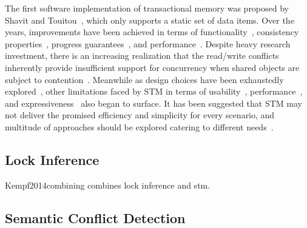 \documentclass[10pt,conference,compsocconf]{IEEEtran}
\begin{document}
The first software implementation of transactional memory was proposed by Shavit and Touitou~\cite{shavit1997software}, which only supports a static set of data items.
Over the years, improvements have been achieved in terms of functionality~\cite{herlihy2003software}, consistency properties~\cite{guerraoui2008correctness}, progress guarantees~\cite{marathe2006lowering}, and performance~\cite{saha2006mcrt,dice2006transactional}. 
Despite heavy research investment, there is an increasing realization that the read/write conflicts inherently provide insufficient support for concurrency when shared objects are subject to contention~\cite{koskinen2010coarse}.
Meanwhile as design choices have been exhaustedly explored~\cite{marathe2004qualitative,marathe2004design}, other limitations faced by STM in terms of usability~\cite{Rossbach2010transactional}, performance~\cite{cascaval2008software}, and expressiveness~\cite{guerraoui2008obstruction} also began to surface.
It has been suggested that STM may not deliver the promised efficiency and simplicity for every scenario, and multitude of approaches should be explored catering to different needs~\cite{attiya2010inherent}.

\subsection{Lock Inference}

Kempf2014combining combines lock inference and stm.

\subsection{Semantic Conflict Detection}






\end{document}
